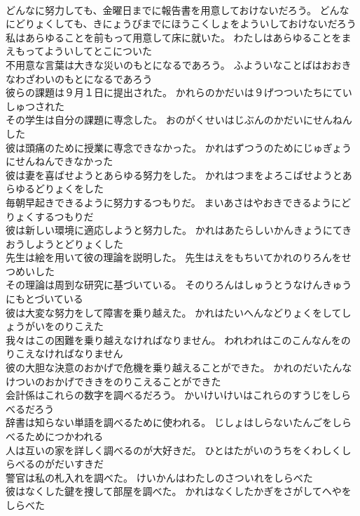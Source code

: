 \documentclass[8pt]{extreport}
\begin{document}
\begin{CJK}{UTF8}{min}
\\	どんなに努力しても、金曜日までに報告書を用意しておけないだろう。	どんなにどりょくしても、きにょうびまでにほうこくしょをよういしておけないだろう 
\\	私はあらゆることを前もって用意して床に就いた。	わたしはあらゆることをまえもってよういしてとこについた 
\\	不用意な言葉は大きな災いのもとになるであろう。	ふよういなことばはおおきなわざわいのもとになるであろう 
\\	彼らの課題は９月１日に提出された。	かれらのかだいは９げつついたちにていしゅつされた 
\\	その学生は自分の課題に専念した。	おのがくせいはじぶんのかだいにせんねんした 
\\	彼は頭痛のために授業に専念できなかった。	かれはずつうのためにじゅぎょうにせんねんできなかった 
\\	彼は妻を喜ばせようとあらゆる努力をした。	かれはつまをよろこばせようとあらゆるどりょくをした 
\\	毎朝早起きできるように努力するつもりだ。	まいあさはやおきできるようにどりょくするつもりだ 
\\	彼は新しい環境に適応しようと努力した。	かれはあたらしいかんきょうにてきおうしようとどりょくした 
\\	先生は絵を用いて彼の理論を説明した。	先生はえをもちいてかれのりろんをせつめいした 
\\	その理論は周到な研究に基づいている。	そのりろんはしゅうとうなけんきゅうにもとづいている 
\\	彼は大変な努力をして障害を乗り越えた。	かれはたいへんなどりょくをしてしょうがいをのりこえた 
\\	我々はこの困難を乗り越えなければなりません。	われわれはこのこんなんをのりこえなければなりません 
\\	彼の大胆な決意のおかげで危機を乗り越えることができた。	かれのだいたんなけついのおかげでききをのりこえることができた 
\\	会計係はこれらの数字を調べるだろう。	かいけいけいはこれらのすうじをしらべるだろう 
\\	辞書は知らない単語を調べるために使われる。	じしょはしらないたんごをしらべるためにつかわれる 
\\	人は互いの家を詳しく調べるのが大好きだ。	ひとはたがいのうちをくわしくしらべるのがだいすきだ 
\\	警官は私の札入れを調べた。	けいかんはわたしのさついれをしらべた 
\\	彼はなくした鍵を捜して部屋を調べた。	かれはなくしたかぎをさがしてへやをしらべた 

\end{CJK}
\end{document}
